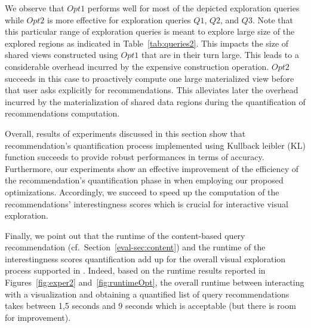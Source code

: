 We observe that $Opt1$ performs well for most of the depicted exploration queries while $Opt2$ is more effective for exploration queries $Q1$, $Q2$, and $Q3$. 
Note that this particular range of exploration queries is meant to explore large size of the explored regions as indicated in Table~\ref{tab:queries2}. This impacts the size of shared views constructed using $Opt1$ that are in their turn large. 
This leads to a considerable overhead incurred by the expensive construction operation.
$Opt2$ succeeds in this case to proactively compute one large materialized view before that user asks explicitly for recommendations. This alleviates later the overhead incurred by the materialization of shared data regions during the quantification of recommendations computation.


Overall, results of experiments discussed in this section show that recommendation's quantification process implemented using Kullback leibler (KL) function succeeds to provide robust performances in terms of accuracy.
Furthermore, our experiments show an effective improvement of the efficiency of the recommendation's quantification phase in \prototype{} when employing our proposed optimizations. Accordingly, we succeed to speed up the computation of the recommendations' interestingness scores which is crucial for interactive visual exploration. 

Finally, we point out that the runtime of the content-based query recommendation (cf.~Section~\ref{eval-sec:content}) and the runtime of the interestingness scores quantification add up for the overall visual exploration process supported in \prototype{}. 
Indeed, based on the runtime results reported in Figures~\ref{fig:exper2} and~\ref{fig:runtimeOpt}, the overall runtime between interacting with a visualization and obtaining a quantified list of query recommendations takes between 1,5 seconds and 9 seconds which is acceptable (but there is room for improvement).








